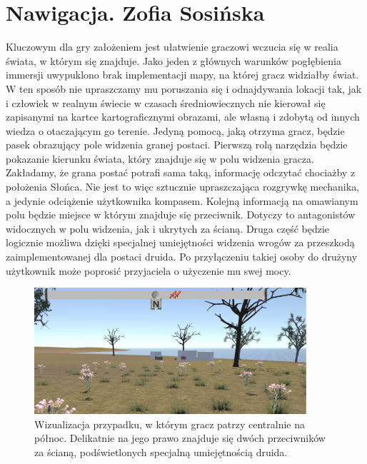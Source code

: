 \section{Nawigacja. Zofia Sosińska}\label{chap:naw}

    Kluczowym dla gry założeniem jest ułatwienie graczowi wczucia się w realia świata, w którym się znajduje. Jako jeden z głównych warunków pogłębienia immersji uwypuklono brak implementacji mapy, na której gracz widziałby świat. W ten sposób nie upraszczamy mu poruszania się i odnajdywania lokacji tak, jak i człowiek w realnym świecie w czasach średniowiecznych nie kierował się zapisanymi na kartce kartograficznymi obrazami, ale własną i zdobytą od innych wiedza o otaczającym go terenie. 
    Jedyną pomocą, jaką otrzyma gracz, będzie pasek obrazujący pole widzenia granej postaci. Pierwszą rolą narzędzia będzie pokazanie kierunku świata, który znajduje się w polu widzenia gracza. Zakładamy, że grana postać potrafi sama taką, informację odczytać chociażby z położenia Słońca. Nie jest to więc sztucznie upraszczająca rozgrywkę mechanika, a jedynie odciążenie użytkownika kompasem. 
    Kolejną informacją na omawianym polu będzie miejsce w którym znajduje się przeciwnik. Dotyczy to antagonistów widocznych w polu widzenia, jak i ukrytych za ścianą. Druga część będzie logicznie możliwa dzięki specjalnej umiejętności widzenia wrogów za przeszkodą zaimplementowanej dla postaci druida. Po przyłączeniu takiej osoby do drużyny użytkownik może poprosić przyjaciela o użyczenie mu swej mocy.

\begin{figure}[htbp]
    \centering
    \includegraphics[width=0.9\textwidth]{images/ui/compass.png}
    \caption{Wizualizacja przypadku, w którym gracz patrzy centralnie na północ. Delikatnie na jego prawo znajduje się dwóch przeciwników za ścianą, podświetlonych specjalną umiejętnością druida.
    }\label{fig:compass}
\end{figure}

